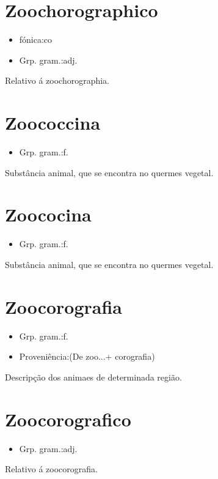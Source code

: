 \section{Zoochorographico}
\begin{itemize}
\item {fónica:co}
\end{itemize}
\begin{itemize}
\item {Grp. gram.:adj.}
\end{itemize}
Relativo á zoochorographia.
\section{Zoococcina}
\begin{itemize}
\item {Grp. gram.:f.}
\end{itemize}
Substância animal, que se encontra no quermes vegetal.
\section{Zoococina}
\begin{itemize}
\item {Grp. gram.:f.}
\end{itemize}
Substância animal, que se encontra no quermes vegetal.
\section{Zoocorografia}
\begin{itemize}
\item {Grp. gram.:f.}
\end{itemize}
\begin{itemize}
\item {Proveniência:(De \textunderscore zoo...\textunderscore  + \textunderscore corografia\textunderscore )}
\end{itemize}
Descripção dos animaes de determinada região.
\section{Zoocorografico}
\begin{itemize}
\item {Grp. gram.:adj.}
\end{itemize}
Relativo á zoocorografia.
